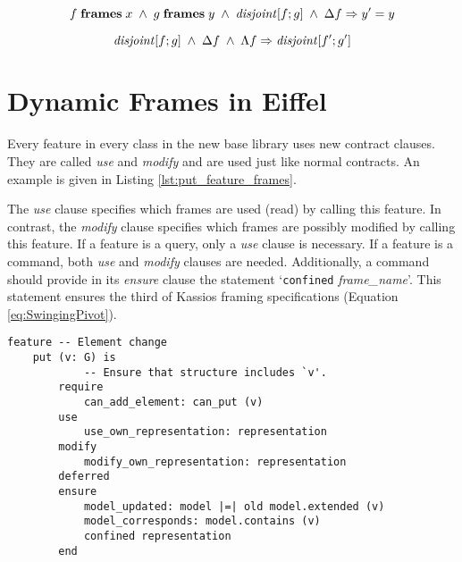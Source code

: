 \begin{equation}
	f \; \text{\bf{frames}} \; x  \; \wedge \; g \; \text{\bf{frames}} \; y \; \wedge \; \text{\textit{disjoint}} [f;g] \; \wedge \; \Delta f \Rightarrow y' = y
	\label{eq:Disjoint}
\end{equation}

\begin{equation}
	\text{\textit{disjoint}} [f;g] \; \wedge \; \Delta f \; \wedge \; \Lambda f \Rightarrow \text{\textit{disjoint}} [f';g']
	\label{eq:Disjoint2}
\end{equation}

\section{Dynamic Frames in Eiffel}
\label{sec:DynamicFramesInEiffel}

Every feature in every class in the new base library uses new contract clauses. They are called \emph{use} and \emph{modify} and are used just like normal contracts. An example is given in Listing \ref{lst:put_feature_frames}.

The \emph{use} clause specifies which frames are used (read) by calling this feature. In contrast, the \emph{modify} clause specifies which frames are possibly modified by calling this feature. If a feature is a query, only a \emph{use} clause is necessary. If a feature is a command, both \emph{use} and \emph{modify} clauses are needed. Additionally, a command should provide in its \emph{ensure} clause the statement `\lstinline!confined! \emph{frame\_name}'. This statement ensures the third of Kassios framing specifications (Equation \ref{eq:SwingingPivot}).

\begin{lstlisting}[float,caption=put feature of the CC\_COLLECTION class.,label=lst:put_feature_frames]
feature -- Element change
	put (v: G) is
			-- Ensure that structure includes `v'.
		require
			can_add_element: can_put (v)
		use
			use_own_representation: representation
		modify
			modify_own_representation: representation
		deferred
		ensure
			model_updated: model |=| old model.extended (v)
			model_corresponds: model.contains (v)
			confined representation
		end
\end{lstlisting}
